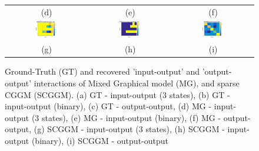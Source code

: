 \documentclass{article}
\begin{document}
\begin{figure}
\begin{tabular}{cc|c}
	(d) & (e) & (f) \\
			  \includegraphics[width=0.3\textwidth]{figure/SCGGMrec_in_out.png} &   \includegraphics[width=0.3\textwidth]{figure/SCGGMrec_in_out_bin2.png} &\includegraphics[width=0.3\textwidth]{figure/SCGGM_out_out.png} \\
	(g) & (h)  & (i) \\
	\end{tabular}
	\caption{Ground-Truth (GT) and recovered 'input-output' and 'output-output' interactions of Mixed Graphical model (MG), and sparse CGGM (SCGGM). (a) GT - input-output (3 states), (b) GT - input-output (binary), (c) GT - output-output, (d) MG - input-output (3 states), (e) MG - input-output (binary), (f) MG - output-output, (g) SCGGM - input-output (3 states), (h) SCGGM - input-output (binary), (i) SCGGM - output-output}
	\label{fig:interactions}
\end{figure}


\end{document}
